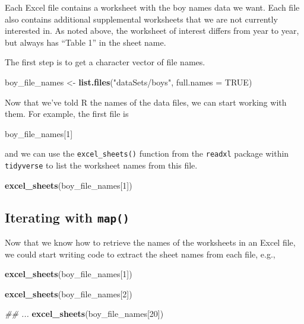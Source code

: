 \documentclass[
]{book}
\newenvironment{Shaded}{\begin{snugshade}}{\end{snugshade}}
\newcommand{\CommentTok}[1]{\textcolor[rgb]{0.56,0.35,0.01}{\textit{#1}}}
\newcommand{\DataTypeTok}[1]{\textcolor[rgb]{0.13,0.29,0.53}{#1}}
\newcommand{\DecValTok}[1]{\textcolor[rgb]{0.00,0.00,0.81}{#1}}
\newcommand{\KeywordTok}[1]{\textcolor[rgb]{0.13,0.29,0.53}{\textbf{#1}}}
\newcommand{\NormalTok}[1]{#1}
\newcommand{\OtherTok}[1]{\textcolor[rgb]{0.56,0.35,0.01}{#1}}
\newcommand{\StringTok}[1]{\textcolor[rgb]{0.31,0.60,0.02}{#1}}
\begin{document}
Each Excel file contains a worksheet with the boy names data we want.
Each file also contains additional supplemental worksheets that we are
not currently interested in. As noted above, the worksheet of interest
differs from year to year, but always has ``Table 1'' in the sheet name.

The first step is to get a character vector of file names.

\begin{Shaded}
\begin{Highlighting}[]
\NormalTok{boy_file_names <-}\StringTok{ }\KeywordTok{list.files}\NormalTok{(}\StringTok{"dataSets/boys"}\NormalTok{, }\DataTypeTok{full.names =} \OtherTok{TRUE}\NormalTok{)}
\end{Highlighting}
\end{Shaded}

Now that we've told R the names of the data files, we can start working
with them. For example, the first file is

\begin{Shaded}
\begin{Highlighting}[]
\NormalTok{boy_file_names[}\DecValTok{1}\NormalTok{]}
\end{Highlighting}
\end{Shaded}

and we can use the \texttt{excel\_sheets()} function from the \texttt{readxl} package
within \texttt{tidyverse} to list the worksheet names from this file.

\begin{Shaded}
\begin{Highlighting}[]
\KeywordTok{excel_sheets}\NormalTok{(boy_file_names[}\DecValTok{1}\NormalTok{])}
\end{Highlighting}
\end{Shaded}

\hypertarget{iterating-with-map}{%
\subsection{\texorpdfstring{Iterating with \texttt{map()}}{Iterating with map()}}\label{iterating-with-map}}

Now that we know how to retrieve the names of the worksheets in an
Excel file, we could start writing code to extract the sheet names from
each file, e.g.,

\begin{Shaded}
\begin{Highlighting}[]
\KeywordTok{excel_sheets}\NormalTok{(boy_file_names[}\DecValTok{1}\NormalTok{])}

\KeywordTok{excel_sheets}\NormalTok{(boy_file_names[}\DecValTok{2}\NormalTok{])}

\CommentTok{## ...}
\KeywordTok{excel_sheets}\NormalTok{(boy_file_names[}\DecValTok{20}\NormalTok{])}
\end{Highlighting}
\end{Shaded}
\end{document}
